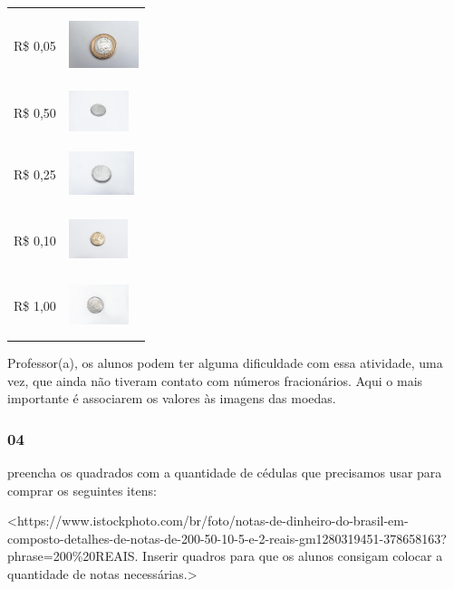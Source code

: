 \begin{longtable}[]{@{}ll@{}}
\toprule
R\$ 0,05 &
\includegraphics[width=0.80577in,height=0.79447in]{media/image60.jpg}\tabularnewline
R\$ 0,50 &
\includegraphics[width=0.69145in,height=0.53632in]{media/image61.jpg}\tabularnewline
R\$ 0,25 &
\includegraphics[width=0.75523in,height=0.67928in]{media/image62.jpg}\tabularnewline
R\$ 0,10 &
\includegraphics[width=0.67617in,height=0.63139in]{media/image63.jpg}\tabularnewline
R\$ 1,00 &
\includegraphics[width=0.69044in,height=0.66964in]{media/image64.jpg}\tabularnewline
\bottomrule
\end{longtable}

Professor(a), os alunos podem ter alguma dificuldade com essa atividade,
uma vez, que ainda não tiveram contato com números fracionários. Aqui o
mais importante é associarem os valores às imagens das moedas.

\subsubsection{04}\label{section-57}

preencha os quadrados com a quantidade de cédulas que precisamos usar
para comprar os seguintes itens:

\textless{}https://www.istockphoto.com/br/foto/notas-de-dinheiro-do-brasil-em-composto-detalhes-de-notas-de-200-50-10-5-e-2-reais-gm1280319451-378658163?phrase=200\%20REAIS.
Inserir quadros para que os alunos consigam colocar a quantidade de
notas necessárias.\textgreater{}

